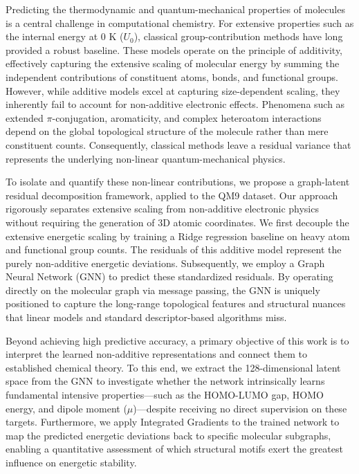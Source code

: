 \documentclass[]{article}
\begin{document}
Predicting the thermodynamic and quantum-mechanical properties of molecules is a central challenge in computational chemistry. For extensive properties such as the internal energy at 0 K ($U_0$), classical group-contribution methods have long provided a robust baseline. These models operate on the principle of additivity, effectively capturing the extensive scaling of molecular energy by summing the independent contributions of constituent atoms, bonds, and functional groups. However, while additive models excel at capturing size-dependent scaling, they inherently fail to account for non-additive electronic effects. Phenomena such as extended $\pi$-conjugation, aromaticity, and complex heteroatom interactions depend on the global topological structure of the molecule rather than mere constituent counts. Consequently, classical methods leave a residual variance that represents the underlying non-linear quantum-mechanical physics.

To isolate and quantify these non-linear contributions, we propose a graph-latent residual decomposition framework, applied to the QM9 dataset. Our approach rigorously separates extensive scaling from non-additive electronic physics without requiring the generation of 3D atomic coordinates. We first decouple the extensive energetic scaling by training a Ridge regression baseline on heavy atom and functional group counts. The residuals of this additive model represent the purely non-additive energetic deviations. Subsequently, we employ a Graph Neural Network (GNN) to predict these standardized residuals. By operating directly on the molecular graph via message passing, the GNN is uniquely positioned to capture the long-range topological features and structural nuances that linear models and standard descriptor-based algorithms miss.

Beyond achieving high predictive accuracy, a primary objective of this work is to interpret the learned non-additive representations and connect them to established chemical theory. To this end, we extract the 128-dimensional latent space from the GNN to investigate whether the network intrinsically learns fundamental intensive properties—such as the HOMO-LUMO gap, HOMO energy, and dipole moment ($\mu$)—despite receiving no direct supervision on these targets. Furthermore, we apply Integrated Gradients to the trained network to map the predicted energetic deviations back to specific molecular subgraphs, enabling a quantitative assessment of which structural motifs exert the greatest influence on energetic stability.
\end{document}
